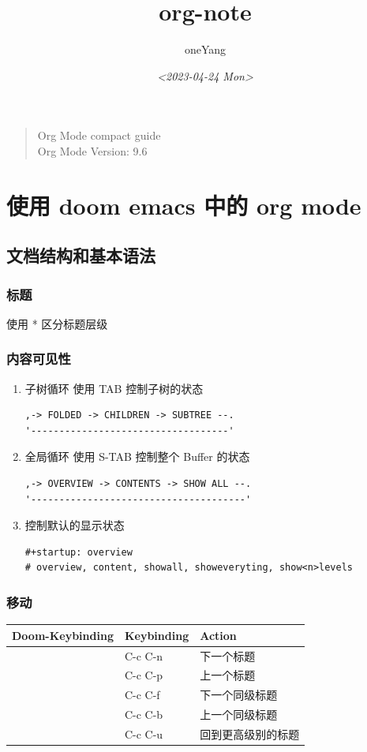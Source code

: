 \documentclass[11pt]{article}
\author{oneYang}
\date{\textit{<2023-04-24 Mon>}}
\title{org-note}
\begin{document}
\maketitle
\tableofcontents

\begin{quote}
Org Mode compact guide  \\[0pt]
Org Mode Version: 9.6
\end{quote}

\section{使用 doom emacs 中的 org mode}
\label{sec:org650ec81}
\subsection{文档结构和基本语法}
\label{sec:org38ad953}
\subsubsection{标题}
\label{sec:org8621d12}
使用 * 区分标题层级
\subsubsection{内容可见性}
\label{sec:orgf4591a2}
\begin{enumerate}
\item 子树循环
\label{sec:org5eea55c}
使用 TAB 控制子树的状态
\begin{verbatim}
,-> FOLDED -> CHILDREN -> SUBTREE --.
'-----------------------------------'
\end{verbatim}
\item 全局循环
\label{sec:org843ad56}
使用 S-TAB 控制整个 Buffer 的状态
\begin{verbatim}
,-> OVERVIEW -> CONTENTS -> SHOW ALL --.
'--------------------------------------'
\end{verbatim}
\item 控制默认的显示状态
\label{sec:orgd27d2aa}
\begin{verbatim}
#+startup: overview
# overview, content, showall, showeveryting, show<n>levels
\end{verbatim}
\end{enumerate}

\subsubsection{移动}
\label{sec:org4aac87f}
\begin{center}
\begin{tabular}{lll}
Doom-Keybinding & Keybinding & Action\\[0pt]
\hline
 & C-c C-n & 下一个标题\\[0pt]
 & C-c C-p & 上一个标题\\[0pt]
 & C-c C-f & 下一个同级标题\\[0pt]
 & C-c C-b & 上一个同级标题\\[0pt]
 & C-c C-u & 回到更高级别的标题\\[0pt]
\end{tabular}
\end{center}
\end{document}
